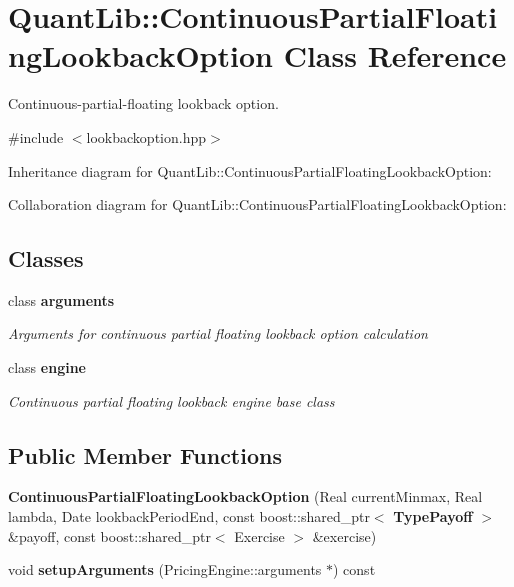 \section{Quant\+Lib\+:\+:Continuous\+Partial\+Floating\+Lookback\+Option Class Reference}
\label{class_quant_lib_1_1_continuous_partial_floating_lookback_option}


Continuous-\/partial-\/floating lookback option.  




{\ttfamily \#include $<$lookbackoption.\+hpp$>$}



Inheritance diagram for Quant\+Lib\+:\+:Continuous\+Partial\+Floating\+Lookback\+Option\+:


Collaboration diagram for Quant\+Lib\+:\+:Continuous\+Partial\+Floating\+Lookback\+Option\+:
\subsection*{Classes}
\begin{DoxyCompactItemize}
\item 
class {\bf arguments}
\begin{DoxyCompactList}\small\item\em Arguments for continuous partial floating lookback option calculation \end{DoxyCompactList}\item 
class {\bf engine}
\begin{DoxyCompactList}\small\item\em Continuous partial floating lookback engine base class \end{DoxyCompactList}\end{DoxyCompactItemize}
\subsection*{Public Member Functions}
\begin{DoxyCompactItemize}
\item 
{\bfseries Continuous\+Partial\+Floating\+Lookback\+Option} (Real current\+Minmax, Real lambda, Date lookback\+Period\+End, const boost\+::shared\+\_\+ptr$<$ {\bf Type\+Payoff} $>$ \&payoff, const boost\+::shared\+\_\+ptr$<$ Exercise $>$ \&exercise)\label{class_quant_lib_1_1_continuous_partial_floating_lookback_option_add9f07dd88900106aad5be45e98d038e}

\item 
void {\bfseries setup\+Arguments} (Pricing\+Engine\+::arguments $\ast$) const \label{class_quant_lib_1_1_continuous_partial_floating_lookback_option_aff940ccbb9369631acd969e37d89b2a2}

\end{DoxyCompactItemize}
